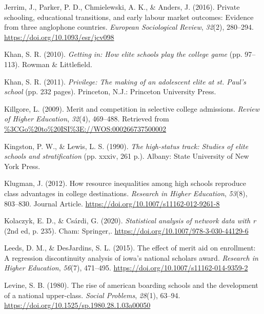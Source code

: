 \documentclass[
  12pt,
]{article}
\newlength{\cslhangindent}
\newlength{\cslentryspacingunit} %
\newenvironment{CSLReferences}[2] %
 {%
  \setlength{\parindent}{0pt}
  \ifodd #1
  \let\oldpar\par
  \def\par{\hangindent=\cslhangindent\oldpar}
  \fi
  \setlength{\parskip}{#2\cslentryspacingunit}
 }%
 {}
\begin{document}
\begin{CSLReferences}{1}{0}
\leavevmode{}%
Jerrim, J., Parker, P. D., Chmielewski, A. K., \& Anders, J. (2016). Private schooling, educational transitions, and early labour market outcomes: Evidence from three anglophone countries. \emph{European Sociological Review}, \emph{32}(2), 280--294. \url{https://doi.org/10.1093/esr/jcv098}

\leavevmode{}%
Khan, S. R. (2010). \emph{Getting in: How elite schools play the college game} (pp. 97--113). Rowman \& Littlefield.

\leavevmode{}%
Khan, S. R. (2011). \emph{Privilege: The making of an adolescent elite at st. Paul's school} (pp. 232 pages). Princeton, N.J.: Princeton University Press.

\leavevmode{}%
Killgore, L. (2009). Merit and competition in selective college admissions. \emph{Review of Higher Education}, \emph{32}(4), 469--488. Retrieved from \url{\%3CGo\%20to\%20ISI\%3E://WOS:000266737500002}

\leavevmode{}%
Kingston, P. W., \& Lewis, L. S. (1990). \emph{The high-status track: Studies of elite schools and stratification} (pp. xxxiv, 261 p.). Albany: State University of New York Press.

\leavevmode{}%
Klugman, J. (2012). How resource inequalities among high schools reproduce class advantages in college destinations. \emph{Research in Higher Education}, \emph{53}(8), 803--830. Journal Article. \url{https://doi.org/10.1007/s11162-012-9261-8}

\leavevmode{}%
Kolaczyk, E. D., \& Csárdi, G. (2020). \emph{Statistical analysis of network data with r} (2nd ed, p. 235). Cham: Springer,. \url{https://doi.org/10.1007/978-3-030-44129-6}

\leavevmode{}%
Leeds, D. M., \& DesJardins, S. L. (2015). The effect of merit aid on enrollment: A regression discontinuity analysis of iowa's national scholars award. \emph{Research in Higher Education}, \emph{56}(7), 471--495. \url{https://doi.org/10.1007/s11162-014-9359-2}

\leavevmode{}%
Levine, S. B. (1980). The rise of american boarding schools and the development of a national upper-class. \emph{Social Problems}, \emph{28}(1), 63--94. \url{https://doi.org/10.1525/sp.1980.28.1.03a00050}


\end{CSLReferences}
\end{document}
